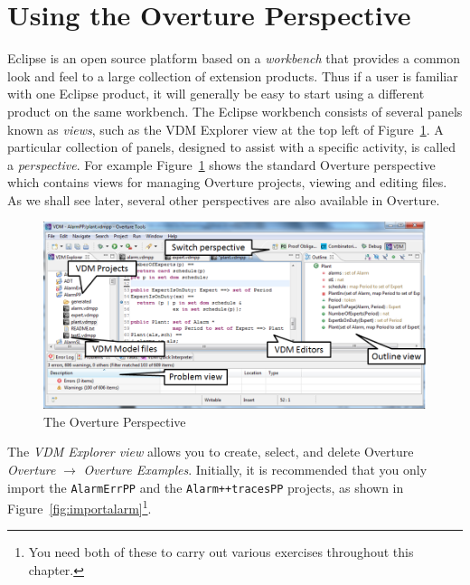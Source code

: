 \section{Using the Overture Perspective}\label{sec:vdmsupport}
Eclipse is an open source platform based on a \emph{workbench} that provides a common look and feel to a large collection of extension products. Thus if a user is familiar with one Eclipse product, it will generally be easy to start using a different product on the same workbench. The Eclipse workbench consists of several panels known as \emph{views}, such as the VDM Explorer view at the top left of Figure~\ref{fig:OverturePerspective}. A particular collection of panels, designed to assist with a specific activity, is called a \emph{perspective}. For example Figure~\ref{fig:OverturePerspective} shows the standard Overture perspective which contains views for managing Overture projects, viewing and editing files. As we shall see later, several other perspectives are also available in Overture.
%
\begin{figure}[!htb]
\begin{center}
  \includegraphics[width=5in]{figures/OverturePerspective}
  \caption[labelInTOC]{The Overture Perspective}
  \label{fig:OverturePerspective}
\end{center}
\end{figure}
%
The \emph{VDM Explorer view} allows you to create, select, and delete Overture \emph{Overture} $\rightarrow$ \emph{Overture Examples}. Initially, it is recommended that you only import the \texttt{AlarmErrPP} and the \texttt{Alarm++tracesPP} projects, as shown in Figure~\ref{fig:importalarm}\footnote{You need both of these to carry out various exercises throughout this chapter.}.
%
